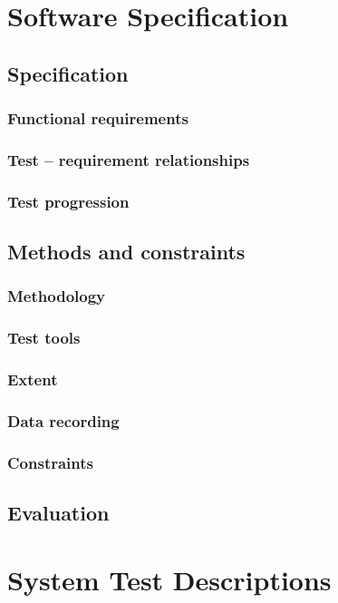 \documentclass[12pt]{report}
\begin{document}


%
%

\chapter{Software Specification}

\section{Specification}
\subsection{Functional requirements}
\subsection{Test -- requirement relationships}
\subsection{Test progression}

\section{Methods and constraints}
\subsection{Methodology}
\subsection{Test tools}
\subsection{Extent}
\subsection{Data recording}
\subsection{Constraints}

\section{Evaluation}

%
%

\chapter{System Test Descriptions}



\end{document}
